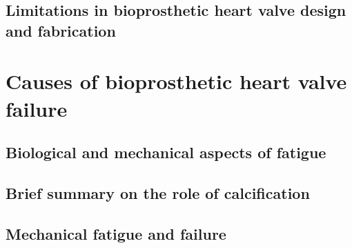 \subsection{Limitations in bioprosthetic heart valve design and fabrication}


\section{Causes of bioprosthetic heart valve failure}

\subsection{Biological and mechanical aspects of fatigue}

\subsection{Brief summary on the role of calcification}

\subsection{Mechanical fatigue and failure}








